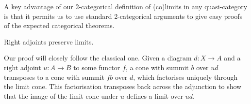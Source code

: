 A key advantage of our 2-categorical definition of (co)limits in any quasi-category is that it permits us to use standard 2-categorical arguments to give easy proofs of the expected categorical theorems.

\begin{prop}\label{prop:RAPL} Right adjoints preserve limits.
\end{prop}

Our proof will closely follow the classical one. Given a diagram $d\colon X \to A$ and a right adjoint $u \colon A \to B$ to some functor $f$, a cone with summit $b$ over $ud$ transposes to a cone with summit $fb$ over $d$, which factorises uniquely through the limit cone. This factorisation transposes back across the adjunction to show that the image of the limit cone under $u$ defines a limit over $ud$.

